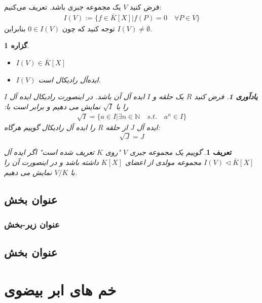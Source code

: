 \documentclass[12pt]{report}
\newtheorem{defn}[thm]{تعریف}
\newtheorem{prop}[thm]{گزاره}
\newtheorem{remem}[thm]{یادآوری}
\begin{document}
	فرض کنید $V$ یک مجموعه جبری باشد. تعریف می‌کنیم:
	\begin{equation*}
		\begin{aligned}
			I(V):=\{f\in \bar{K}[X]| f(P)=0 \quad \forall P\in V\}
		\end{aligned}
	\end{equation*}
	توجه کنید که چون 
	$0\in I(V)$
	بنابراین 
	$I(V)\neq \emptyset$.
	\begin{prop}
		\begin{itemize}
			\item 
			$I(V) \in \bar{K}[X]$
			\item 
			$I(V)$
			ایده‌آل رادیکال است.
		\end{itemize}
		\begin{remem}
			فرض کنید $R$ یک حلقه و $I$ ایده آل آن باشد. در اینصورت رادیکال ایده آل $I$ را با 
			$\sqrt{I}$
			نمایش می دهیم و برابر است با:
			\begin{equation*}
				\begin{aligned}
					\sqrt{I}=\{a\in I |\exists n\in \mathbb{N} \quad s.t. \quad a^n\in I\}
				\end{aligned}
			\end{equation*} 
			ایده آل $J$ از حلقه $R$ را ایده آل رادیکال گوییم هرگاه:
			$$\sqrt{J}=J$$
		\end{remem}
	\end{prop}
	\begin{defn}
		گوییم یک مجموعه جبری $V$ "روی $K$ تعریف شده است" اگر ایده آل 
		$I(V)\lhd \bar{K}[X]$
		مجموعه مولدی از اعضای 
		$K[X]$
		داشته باشد و در اینصورت آن را با 
		$V/K$
		نمایش می دهیم.
	\end{defn}
	
	
	
	\section{عنوان بخش}
	
	\subsection{عنوان زیر-بخش}
	
	\section{عنوان بخش}
	
	\chapter{خم های ابر بیضوی}
\end{document}

